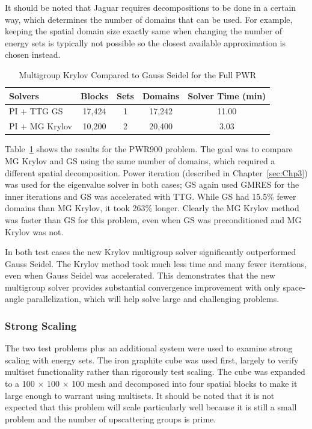 It should be noted that Jaguar requires decompositions to be done in a certain way, which determines the number of domains that can be used. For example, keeping the spatial domain size exactly same when changing the number of energy sets is typically not possible so the closest available approximation is chosen instead.

\begin{table}[!h]
\caption{Multigroup Krylov Compared to Gauss Seidel for the Full PWR}
\begin{center}
\begin{tabular}{l c c c c}
\hline
Solvers & Blocks & Sets & Domains & Solver Time (min) \\[0.5ex]
\hline
PI + TTG GS & 17,424 & 1 & 17,242 & 11.00 \\
PI + MG Krylov & 10,200 & 2 & 20,400 & 3.03 \\
\hline
\end{tabular}
\end{center}
\label{table:MGkrylovPWR}
\end{table}
%
Table~\ref{table:MGkrylovPWR} shows the results for the PWR900 problem. The goal was to compare MG Krylov and GS using the same number of domains, which required a different spatial decomposition. Power iteration (described in Chapter~\ref{sec:Chp3}) was used for the eigenvalue solver in both cases; GS again used GMRES for the inner iterations and GS was accelerated with TTG. While GS had 15.5\% fewer domains than MG Krylov, it took 263\% longer. Clearly the MG Krylov method was faster than GS for this problem, even when GS was preconditioned and MG Krylov was not. 

In both test cases the new Krylov multigroup solver significantly outperformed Gauss Seidel. The Krylov method took much less time and many fewer iterations, even when Gauss Seidel was accelerated. This demonstrates that the new multigroup solver provides substantial convergence improvement with only space-angle parallelization, which will help solve large and challenging problems. 

\subsubsection{Strong Scaling}
The two test problems plus an additional system were used to examine strong scaling with energy sets. The iron graphite cube was used first, largely to verify multiset functionality rather than rigorously test scaling. The cube was expanded to a 100 $\times$ 100 $\times$ 100 mesh and decomposed into four spatial blocks to make it large enough to warrant using multisets. It should be noted that it is not expected that this problem will scale particularly well because it is still a small problem and the number of upscattering groups is prime. 

